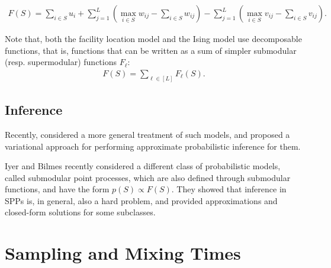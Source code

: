 \begin{example}[\fldc{}]
\citep{djolonga16mixed}
\begin{align*}
F(S) = \sum_{i \in S} u_i + \sum_{j=1}^{L} \left(\max_{i \in S} w_{ij} - \sum_{i \in S} w_{ij}\right) - \sum_{j=1}^{L} \left(\max_{i \in S} v_{ij} - \sum_{i \in S} v_{ij}\right).
\end{align*}
\end{example}

Note that, both the facility location model and the Ising model use decomposable functions, that is, functions that can be written as a sum of simpler submodular (resp. supermodular) functions $F_{\ell}$:
\begin{align} \label{eq:fdec}
F(S) = \sum_{\ell \in [L]} F_{\ell}(S).
\end{align}


\subsection{Inference}

Recently, \citet{djolonga14} considered a more general treatment of such models, and proposed a variational approach for performing approximate probabilistic inference for them.



Iyer and Bilmes \citep{iyer15} recently considered a different class of probabilistic models, called submodular point processes, which are also defined through submodular functions, and have the form $p(S) \propto F(S)$.
They showed that inference in SPPs is, in general, also a hard problem, and provided approximations and closed-form solutions for some subclasses.


\section{Sampling and Mixing Times}

